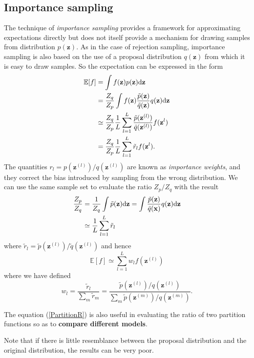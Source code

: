 \documentclass[a4paper]{report}
\newcommand{\ud}{\mathrm{d}}
\renewcommand{\bf}{\mathbf}
\newcommand{\bb}{\mathbb}
\newcommand{\imp}[1]{{\color{blue}\textit{#1}}}
\begin{document}
\subsection{Importance sampling}
The technique of \imp{importance sampling} provides a framework for approximating expectations directly but does not itself provide a mechanism for drawing samples from distribution $p(\bf{z})$. As in the case of rejection sampling, importance sampling is also based on the use of a proposal distribution $q(\bf{z})$ from which it is easy to draw samples. So the expectation can be expressed in the form
\begin{align}
	\bb{E}[f] &= \int f(\bf{z})p(\bf{z}) \ud \bf{z} \notag \\
	&= \frac{Z_q}{Z_p} \int f(\bf{z})\frac{\tilde{p}(\bf{z})}{\tilde{q}(\bf{z})}q(\bf{z}) \ud \bf{z} \notag \\
	&\simeq \frac{Z_q}{Z_p}\frac{1}{L} \sum_{l=1}^{L} \frac{\tilde{p}(\bf{z}^{(l)})}{\tilde{q}(\bf{z}^{(l)})} f(\bf{z}^{l}) \\
	&= \frac{Z_q}{Z_p}\frac{1}{L} \sum_{l=1}^{L} \tilde{r}_l f(\bf{z}^{l}).
\end{align}
The quantities $r_l = p(\bf{z}^{(l)})/q(\bf{z}^{(l)})$ are known as \imp{importance weights}, and they correct the bias introduced by sampling from the wrong distribution. We can use the same sample set to evaluate the ratio $Z_p/Z_q$ with the result
\begin{align}
	\frac{Z_p}{Z_q} &= \frac{1}{Z_q}\int \tilde{p}(\bf{z}) \ud \bf{z} = \int \frac{\tilde{p}(\bf{z})}{\tilde{q}(\bf{x})} q(\bf{z})\ud \bf{z} \notag \\
	&\simeq \frac{1}{L} \sum_{l=1}^{L} \tilde{r}_l	\label{PartitionR}
\end{align}
where $\tilde{r}_l =  \tilde{p}(\bf{z}^{(l)})/\tilde{q}(\bf{z}^{(l)})$ and hence
\begin{equation}
\boxed{	\bb{E}[f] \simeq \sum_{l=1}^L w_l f(\bf{z}^{(l)})}
\end{equation}
where we have defined
\begin{equation}
	w_l = \frac{\tilde{r}_l}{\sum_m \tilde{r}_m} = \frac{\tilde{p}(\bf{z}^{(l)})/q(\bf{z}^{(l)})}{\sum_m \tilde{p}(\bf{z}^{(m)})/q(\bf{z}^{(m)})}. \label{importance}
\end{equation}

The equation (\ref{PartitionR}) is also useful in evaluating the ratio of two partition functions so as to \textbf{compare different models}.

Note that if there is little resemblance between the proposal distribution and the original distribution, the results can be very poor.
\end{document}
